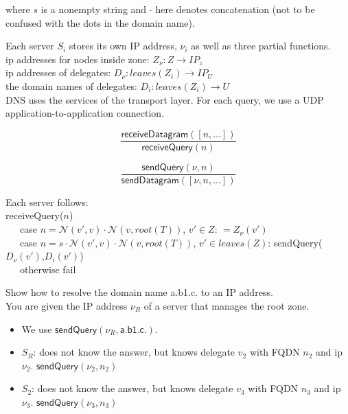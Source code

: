 where $s$ is a nonempty string and $\cdot$ here denotes concatenation
(not to be confused with the dots in the domain name). 


Each server $S_i$ stores its own IP address, $\nu_i$ as well as three partial functions. \\
ip addresses for nodes inside zone: $Z_{\nu} : Z \rightarrow IP_z$\\
ip addresses of delegates: $D_{\nu} : leaves(Z_i) \rightarrow IP_U$\\
the domain names of delegates: $D_i : leaves(Z_i) \rightarrow U$\\

DNS uses the services of the transport layer. 
For each query, we use a UDP application-to-application connection. 

$$\frac{\textsf{receiveDatagram}([n,...])}{\textsf{receiveQuery}(n)}$$

$$\frac{\textsf{sendQuery}(\nu,n)}{\textsf{sendDatagram}([\nu,n,...])}$$



Each server follows:\\
\textsf{receiveQuery}($n$)\\
~~~case $n=\mathcal{N}(v',v)\cdot \mathcal{N}(v,root(T))$, $v' \in Z$:  $= Z_{\nu} (v')$   \\
~~~case $n = s \cdot \mathcal{N}(v',v)\cdot \mathcal{N}(v,root(T))$, $v' \in leaves(Z)$:  \textsf{sendQuery}($D_{\nu}(v')$,$D_{i}(v')$)  \\
~~~otherwise fail


\frmrule 

\begin{example}
Show how to resolve the domain name \textsf{a.b1.c.} to an IP address. \\
You are given the IP address $\nu_R$ of a server that manages the root zone. 

\begin{itemize}[nosep]
\renewcommand{\labelitemi}{$\Box$}
\item We use $\textsf{sendQuery}(\nu_R,\textsf{a.b1.c.})$. 
\item $S_R$: does not know the answer, but knows delegate $v_2$ with FQDN $n_2$ and ip $\nu_2$. 
$\textsf{sendQuery}(\nu_2,n_2)$
\item $S_2$: does not know the answer, but knows delegate $v_3$ with FQDN $n_3$ and ip $\nu_3$. 
$\textsf{sendQuery}(\nu_3,n_3)$
\end{itemize}

\end{example}

